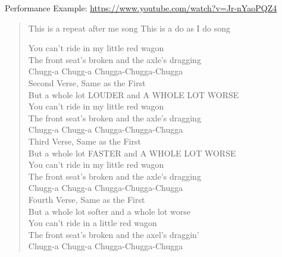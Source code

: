 
Performance Example: \url{https://www.youtube.com/watch?v=Jr-nYaoPQZ4}\\

\begin{verse}
This is a repeat after me song
This is a do as I do song

You can't ride in my little red wagon \\
The front seat's broken and the axle's dragging \\
Chugg-a Chugg-a Chugga-Chugga-Chugga \\

Second Verse, Same as the First \\
But a whole lot LOUDER and A WHOLE LOT WORSE \\

You can't ride in my little red wagon \\
The front seat's broken and the axle's dragging \\
Chugg-a Chugg-a Chugga-Chugga-Chugga \\

Third Verse, Same as the First \\
But a whole lot FASTER and A WHOLE LOT WORSE \\

You can't ride in my little red wagon \\
The front seat's broken and the axle's dragging \\
Chugg-a Chugg-a Chugga-Chugga-Chugga \\

Fourth Verse, Same as the First \\
But a whole lot softer and a whole lot worse \\

You can't ride in a little red wagon\\
The front seat's broken and the axel's draggin'\\
Chugg-a Chugg-a Chugga-Chugga-Chugga \\

\end{verse}

